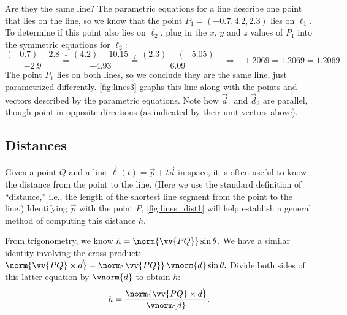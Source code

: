 {Are they the same line? The parametric equations for a line describe one point that lies on the line, so we know that the point $P_1 = (-0.7,4.2,2.3)$ lies on $\ell_1$. To determine if this point also lies on $\ell_2$, plug in the $x$, $y$ and $z$ values of $P_1$ into the symmetric equations for $\ell_2$:
\small
$$\frac{(-0.7)-2.8}{-2.9} \stackrel{?}{=} \frac{(4.2)-10.15}{-4.93} \stackrel{?}{=} \frac{(2.3)-(-5.05)}{6.09} \quad \Rightarrow \quad 1.2069=1.2069=1.2069.$$
\normalsize
The point $P_1$ lies on both lines, so we conclude they are the same line, just parametrized differently. \autoref{fig:lines3} graphs this line along with the points and vectors described by the parametric equations. Note how $\vec d_1$ and $\vec d_2$ are parallel, though point in opposite directions (as indicated by their unit vectors above).}

\subsection*{Distances}

Given a point $Q$ and a line $\vec\ell(t) = \vec p+t\vec d$ in space, it is often useful to know the distance from the point to the line. (Here we use the standard definition of ``distance,'' i.e., the length of the shortest line segment from the point to the line.) Identifying $\vec p$ with the point $P$, \autoref{fig:lines_dist1} will help establish a general method of computing this distance $h$.


From trigonometry, we know $h = \norm{\vv{PQ}}\sin\theta$. We have a similar identity involving the cross product: $\norm{\vv{PQ}\times \vec d} = \norm{\vv{PQ}}\, \vnorm{d}\sin\theta.$ Divide both sides of this latter equation by $\vnorm{d}$ to obtain $h$:
\begin{equation}
h = \frac{\norm{\vv{PQ}\times \vec d}}{\vnorm{d}}.
\label{eq:lines2}
\end{equation}

